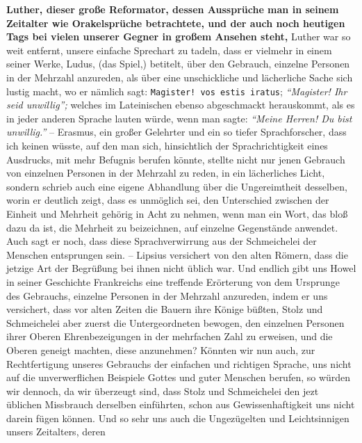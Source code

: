 \textbf{Luther, dieser große Reformator, dessen
Aussprüche man in seinem Zeitalter
wie Orakelsprüche betrachtete, und der auch noch heutigen Tags bei vielen
unserer Gegner in großem Ansehen steht,} Luther
war so weit entfernt, unsere
einfache Sprechart zu tadeln, dass er vielmehr in einem seiner Werke,
Ludus, (das
Spiel,) betitelt, über den Gebrauch, einzelne Personen in der Mehrzahl
anzureden, als über eine unschickliche und lächerliche Sache sich lustig macht,
wo er nämlich sagt: \texttt{Magister! vos estis iratus}; \textit{"`Magister! Ihr
seid
unwillig"';} welches im Lateinischen ebenso abgeschmackt
herauskommt, als es in
jeder anderen Sprache lauten würde, wenn man sagte:
\textit{"`Meine Herren! Du bist unwillig."'} --
Erasmus, ein großer Gelehrter und ein so tiefer
Sprachforscher,
dass ich keinen wüsste, auf den man sich, hinsichtlich der Sprachrichtigkeit
eines
Ausdrucks, mit mehr Befugnis berufen könnte, stellte nicht nur jenen Gebrauch
von einzelnen Personen in der Mehrzahl zu reden, in ein lächerliches Licht,
sondern schrieb auch eine eigene Abhandlung über die Ungereimtheit desselben,
worin er deutlich zeigt, dass es unmöglich sei, den Unterschied zwischen der
Einheit und Mehrheit gehörig in Acht zu nehmen, wenn man ein Wort, das bloß dazu
da ist, die Mehrheit zu beizeichnen, auf einzelne Gegenstände anwendet. Auch
sagt er noch, dass diese Sprachverwirrung aus der Schmeichelei der Menschen
entsprungen sein. -- Lipsius versichert von den alten
Römern, dass die jetzige Art
der Begrüßung bei ihnen nicht üblich war. Und endlich gibt uns
Howel in seiner
Geschichte Frankreichs eine treffende Erörterung von dem Ursprunge des
Gebrauchs, einzelne Personen in der Mehrzahl anzureden, indem er uns versichert,
dass vor alten Zeiten die Bauern ihre
Könige büßten, Stolz und Schmeichelei aber
zuerst die Untergeordneten bewogen, den einzelnen Personen ihrer Oberen
Ehrenbezeigungen in der mehrfachen Zahl zu erweisen, und die Oberen geneigt
machten, diese anzunehmen? Könnten wir nun auch, zur Rechtfertigung unseres
Gebrauchs der einfachen und richtigen Sprache, uns nicht auf die unverwerflichen
Beispiele Gottes und guter Menschen berufen, so würden wir dennoch, da wir
überzeugt sind, dass Stolz und Schmeichelei den jezt üblichen Missbrauch
derselben
einführten, schon aus Gewissenhaftigkeit uns nicht darein fügen können. Und so
sehr uns auch die Ungezügelten und Leichtsinnigen unsers Zeitalters, deren
